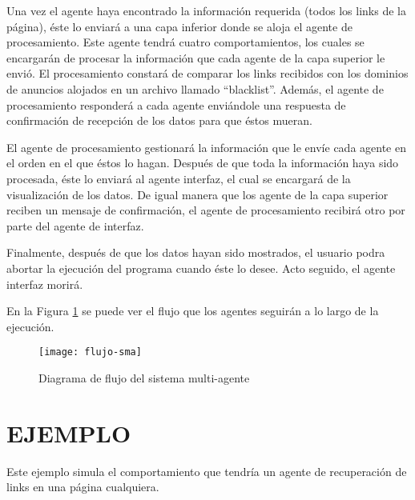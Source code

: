 \documentclass{pre-tfg}
\begin{document}
Una vez el agente haya encontrado la información requerida (todos los links de la página), éste lo enviará a una capa inferior donde se aloja el agente de procesamiento. Este agente tendrá cuatro comportamientos, los cuales se encargarán de procesar la información que cada agente de la capa superior le envió. El procesamiento constará de comparar los links recibidos con los dominios de anuncios alojados en un archivo llamado ``blacklist''. Además, el agente de procesamiento responderá a cada agente enviándole una respuesta de confirmación de recepción de los datos para que éstos mueran.

El agente de procesamiento gestionará la información que le envíe cada agente en el orden en el que éstos lo hagan. Después de que toda la información haya sido procesada, éste lo enviará al agente interfaz, el cual se encargará de la visualización de los datos. De igual manera que los agente de la capa superior reciben un mensaje de confirmación, el agente de procesamiento recibirá otro por parte del agente de interfaz. 

Finalmente, después de que los datos hayan sido mostrados, el usuario podra abortar la ejecución del programa cuando éste lo desee. Acto seguido, el agente interfaz morirá.

En la Figura \ref{fig:flujo-sma} se puede ver el flujo que los agentes seguirán a lo largo de la ejecución.

\begin{figure}[h]
    \centering
    \texttt{[image: flujo-sma]}
    \caption{Diagrama de flujo del sistema multi-agente}
    \label{fig:flujo-sma}
\end{figure}

\clearpage

\section{EJEMPLO}

Este ejemplo simula el comportamiento que tendría un agente de recuperación de links en una página cualquiera.
\end{document}
